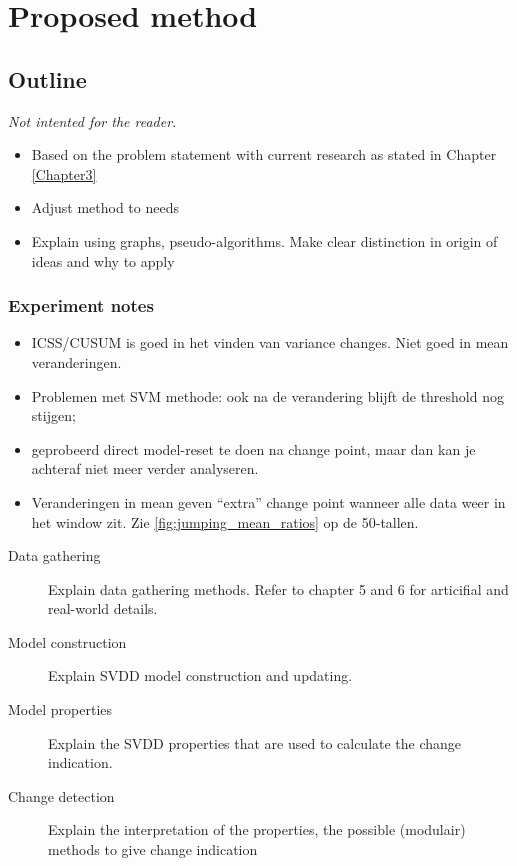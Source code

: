 
\chapter{Proposed method}

\label{Chapter4} %


\section{Outline}
\emph{Not intented for the reader.}
\begin{itemize}
  \item Based on the problem statement with current research as stated in Chapter \ref{Chapter3}
  \item Adjust method to needs
  \item Explain using graphs, pseudo-algorithms. Make clear distinction in origin of ideas and why to apply
\end{itemize}


\subsection{Experiment notes}
\begin{itemize}
  \item ICSS/CUSUM is goed in het vinden van variance changes. Niet goed in mean veranderingen.
  \item Problemen met SVM methode: ook na de verandering blijft de threshold nog stijgen;
  \item geprobeerd direct model-reset te doen na change point, maar dan kan je achteraf niet meer verder analyseren.
  \item Veranderingen in mean geven ``extra'' change point wanneer alle data weer in het window zit. Zie \ref{fig:jumping_mean_ratios} op de 50-tallen.
\end{itemize}


\begin{description}
  \item[Data gathering] Explain data gathering methods. Refer to chapter 5 and 6 for articifial and real-world details.
  \item[Model construction] Explain SVDD model construction and updating.
  \item[Model properties] Explain the SVDD properties that are used to calculate the change indication.
  \item[Change detection] Explain the interpretation of the properties, the possible (modulair) methods to give change indication
\end{description}


